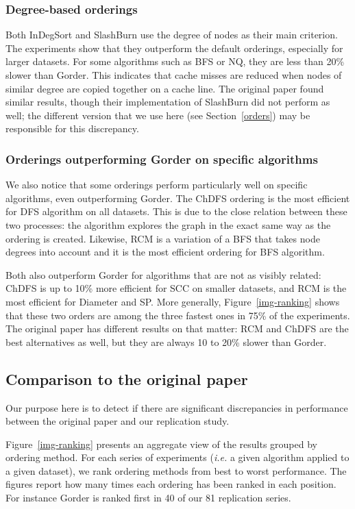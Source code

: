 \subsubsection{Degree-based orderings}
%
Both InDegSort and SlashBurn use the degree of nodes as their main criterion. The experiments show that they outperform the default orderings, especially for larger datasets. For some algorithms such as BFS or NQ, they are less than 20\% slower than Gorder. This indicates that cache misses are reduced when nodes of similar degree are copied together on a cache line. 
The original paper found similar results, though their implementation of SlashBurn did not perform as well; the different version that we use here (see Section~\ref{orders}) may be responsible for this discrepancy. 


\subsubsection{Orderings outperforming Gorder on specific algorithms}
%
We also notice that some orderings perform particularly well on specific algorithms, even outperforming Gorder.
The ChDFS ordering is the most efficient for DFS algorithm on all datasets. This is due to the close relation between these two processes: the algorithm explores the graph in the exact same way as the ordering is created.
%
Likewise, RCM is a variation of a BFS that takes node degrees into account and it is the most efficient ordering for BFS algorithm.

Both also outperform Gorder for algorithms that are not as visibly related: ChDFS is up to 10\% more efficient for SCC on smaller datasets, and RCM is the most efficient for Diameter and SP.
More generally, Figure~\ref{img-ranking} shows that these two orders are among the three fastest ones in 75\% of the experiments. The original paper has different results on that matter: RCM and ChDFS are the best alternatives as well, but they are always 10 to 20\% slower than Gorder. 


\subsection{Comparison to the original paper}
Our purpose here is to detect if there are significant discrepancies in performance between the original paper and our replication study.

Figure~\ref{img-ranking} presents an aggregate view of the results grouped by ordering method.
%
For each series of experiments (\textit{i.e.} a given algorithm applied to a given dataset), we rank ordering methods from best to worst performance.
%
The figures report how many times each ordering has been ranked in each position. For instance Gorder is ranked first in 40 of our 81 replication series.


